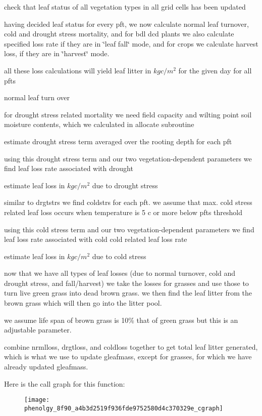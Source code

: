 check that leaf status of all vegetation types in all grid cells has been updated





having decided leaf status for every pft, we now calculate normal leaf turnover, cold and drought stress mortality, and for bdl dcd plants we also calculate specified loss rate if they are in \char`\"{}leaf fall\char`\"{} mode, and for crops we calculate harvest loss, if they are in \char`\"{}harvest\char`\"{} mode.

all these loss calculations will yield leaf litter in $kg c/m^2$ for the given day for all pfts

normal leaf turn over

for drought stress related mortality we need field capacity and wilting point soil moisture contents, which we calculated in allocate subroutine

estimate drought stress term averaged over the rooting depth for each pft

\begin{DoxyVerb}    using this drought stress term and our two vegetation-dependent
    parameters we find leaf loss rate associated with drought \end{DoxyVerb}


estimate leaf loss in $kg c/m^2$ due to drought stress

similar to drgtstrs we find coldstrs for each pft. we assume that max. cold stress related leaf loss occurs when temperature is 5 c or more below pft\textquotesingle{}s threshold

using this cold stress term and our two vegetation-\/dependent parameters we find leaf loss rate associated with cold cold related leaf loss rate

estimate leaf loss in $kg c/m^2$ due to cold stress

now that we have all types of leaf losses (due to normal turnover, cold and drought stress, and fall/harvest) we take the losses for grasses and use those to turn live green grass into dead brown grass. we then find the leaf litter from the brown grass which will then go into the litter pool.

we assume life span of brown grass is 10\% that of green grass but this is an adjustable parameter.

combine nrmlloss, drgtloss, and coldloss together to get total leaf litter generated, which is what we use to update gleafmass, except for grasses, for which we have already updated gleafmass.

Here is the call graph for this function\+:\nopagebreak
\begin{figure}[H]
\begin{center}
\leavevmode
\texttt{[image: phenolgy\_8f90\_a4b3d2519f936fde9752580d4c370329e\_cgraph]}
\end{center}
\end{figure}


